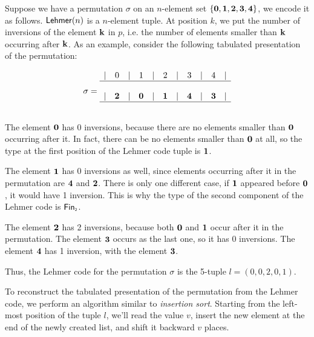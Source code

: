 
Suppose we have a permutation $\sigma$ on an $n$-element set $\{\mathbf{0}, \mathbf{1}, \mathbf{2}, \mathbf{3}, \mathbf{4}\}$, we encode it
as follows. $\Lehmer[n]$ is a $n$-element tuple. At position $k$, we put the number of inversions of the element
$\mathbf{k}$ in $p$, i.e. the number of elements smaller than $\mathbf{k}$ occurring after $\mathbf{k}$. As an example, consider the
following tabulated presentation of the permutation:


\[
  \sigma =
  \begin{array}{ccccccccccccccc}
    | & 0      & | & 1      & | & 2      & | & 3      & | & 4      & | \\
    \hline                                                             \\
    | & \mathbf{2} & | & \mathbf{0} & | & \mathbf{1} & | & \mathbf{4} & | & \mathbf{3} & | \\
    \hline                                                             \\
  \end{array}
\]


The element $\mathbf{0}$ has 0 inversions, because there are no elements smaller than $\mathbf{0}$ occurring after it. In fact,
there can be no elements smaller than $\mathbf{0}$ at all, so the type at the first position of the Lehmer code tuple is
${\mathbf{1}}$.

The element $\mathbf{1}$ has 0 inversions as well, since elements occurring after it in the permutation are $\mathbf{4}$ and
$\mathbf{2}$. There is only one different case, if $\mathbf{1}$ appeared before $\mathbf{0}$, it would have 1 inversion. This is why
the type of the second component of the Lehmer code is $\Fin[2]$.

The element $\mathbf{2}$ has 2 inversions, because both $\mathbf{0}$ and $\mathbf{1}$ occur after it in the permutation. The element
$\mathbf{3}$ occurs as the last one, so it has 0 inversions. The element $\mathbf{4}$ has 1 inversion, with the element
$\mathbf{3}$.

Thus, the Lehmer code for the permutation $\sigma$ is the 5-tuple $l = (0, 0, 2, 0, 1)$.

To reconstruct the tabulated presentation of the permutation from the Lehmer code, we perform an algorithm similar to
\emph{insertion sort}. Starting from the left-most position of the tuple $l$, we'll read the value $v$, insert the new
element at the end of the newly created list, and shift it backward $v$ places.

